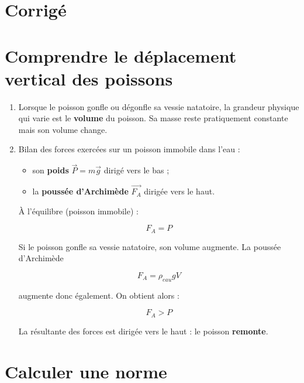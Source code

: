 \documentclass[a4paper,11pt,fleqn]{scrartcl}%
\begin{document}
\section*{Corrigé}

\section{Comprendre le déplacement vertical des poissons}

\begin{enumerate}
\item Lorsque le poisson gonfle ou dégonfle sa vessie natatoire, la grandeur physique qui varie est le \textbf{volume} du poisson. Sa masse reste pratiquement constante mais son volume change.

\item Bilan des forces exercées sur un poisson immobile dans l'eau :
\begin{itemize}
\item son \textbf{poids} $\vec{P}=m\vec{g}$ dirigé vers le bas ;
\item la \textbf{poussée d'Archimède} $\vec{F_A}$ dirigée vers le haut.
\end{itemize}

À l'équilibre (poisson immobile) :

\[
F_A = P
\]

Si le poisson gonfle sa vessie natatoire, son volume augmente. La poussée d'Archimède

\[
F_A = \rho_{eau} g V
\]

augmente donc également. On obtient alors :

\[
F_A > P
\]

La résultante des forces est dirigée vers le haut : le poisson \textbf{remonte}.
\end{enumerate}

\section{Calculer une norme}
\end{document}
